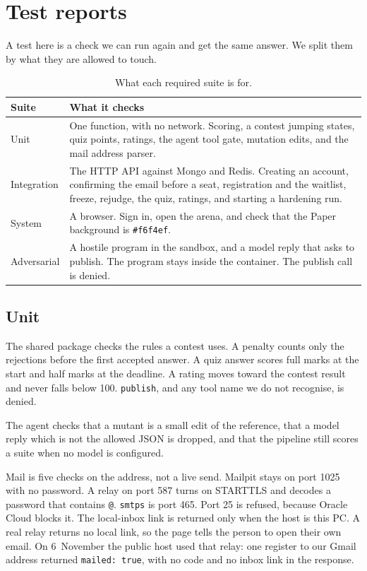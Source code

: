 \documentclass[11pt,a4paper]{article}
\begin{document}
\section{Test reports}
\label{sec:tests}

A test here is a check we can run again and get the same answer. We split them by what they are allowed to touch.

\begin{table}[ht]
\centering
\caption{What each required suite is for.}
\label{tab:kinds}
{\small
\begin{tabularx}{\textwidth}{@{}l Y@{}}
\toprule
Suite & What it checks \\
\midrule
Unit &
One function, with no network. Scoring, a contest jumping states, quiz points, ratings, the agent tool gate, mutation edits, and the mail address parser. \\
Integration &
The HTTP API against Mongo and Redis. Creating an account, confirming the email before a seat, registration and the waitlist, freeze, rejudge, the quiz, ratings, and starting a hardening run. \\
System &
A browser. Sign in, open the arena, and check that the Paper background is \texttt{\#f6f4ef}. \\
Adversarial &
A hostile program in the sandbox, and a model reply that asks to publish. The program stays inside the container. The publish call is denied. \\
\bottomrule
\end{tabularx}
}
\end{table}

\subsection{Unit}

The shared package checks the rules a contest uses. A penalty counts only the rejections before the first accepted answer. A quiz answer scores full marks at the start and half marks at the deadline. A rating moves toward the contest result and never falls below 100. \texttt{publish}, and any tool name we do not recognise, is denied.

The agent checks that a mutant is a small edit of the reference, that a model reply which is not the allowed JSON is dropped, and that the pipeline still scores a suite when no model is configured.

Mail is five checks on the address, not a live send. Mailpit stays on port 1025 with no password. A relay on port 587 turns on STARTTLS and decodes a password that contains \texttt{@}. \texttt{smtps} is port 465. Port 25 is refused, because Oracle Cloud blocks it. The local-inbox link is returned only when the host is this PC. A real relay returns no local link, so the page tells the person to open their own email. On 6~November the public host used that relay: one register to our Gmail address returned \texttt{mailed: true}, with no code and no inbox link in the response.
\end{document}
